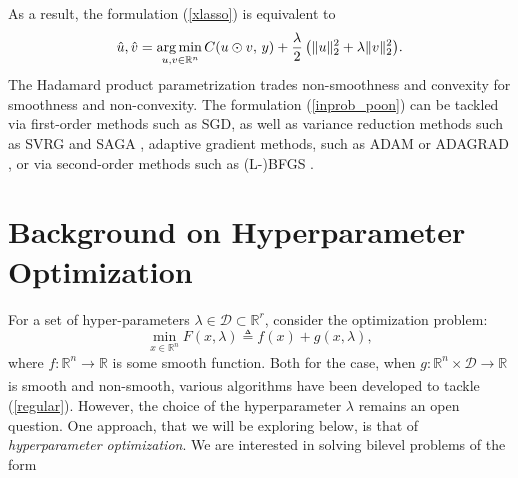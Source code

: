 \documentclass[11pt, twoside]{report}
\begin{document}
As a result, the formulation (\ref{xlasso}) is equivalent to 
\begin{equation} \label{inprob_poon}
    \hat{u},\hat{v} = \underset{u,v \in \mathbb{R}^{n}} {\operatorname*{arg\, min \,}}{C(u \odot v, \,y) + \frac \lambda 2 \left( \|u\|^2_2 + \lambda \|v\|^2_2 \right)}. 
\end{equation}
The Hadamard product parametrization trades non-smoothness and convexity for smoothness and non-convexity. The formulation (\ref{inprob_poon}) can be tackled via first-order methods such as SGD, as well as variance reduction methods such as SVRG and SAGA \cite{defazio2014saga, johnson2013accelerating}, adaptive gradient methods, such as ADAM or ADAGRAD \cite{kingma2014adam, gupta2014training}, or via second-order methods such as (L-)BFGS \cite{liu1989limited}.

\chapter{Background on Hyperparameter Optimization}
For a set of hyper-parameters $\lambda \in \mathcal{D} \subset \mathbb{R}^r$, consider the optimization problem:
\begin{equation} \label{regular}
    \min _{x \in \mathbb{R}^n} F(x,\lambda) \triangleq f(x) + g(x,\lambda),
\end{equation}
where $f: \mathbb{R}^n \xrightarrow[]{} \mathbb{R}$ is some smooth function. Both for the case, when $g: \mathbb{R}^n \times \mathcal{D} \xrightarrow[]{} \mathbb{R}$ is smooth and non-smooth, various algorithms have been developed to tackle (\ref{regular}). However, the choice of the hyperparameter $\lambda$ remains an open question. One approach, that we will be exploring below, is that of \textit{hyperparameter optimization}. We are interested in solving bilevel problems of the form
\end{document}
